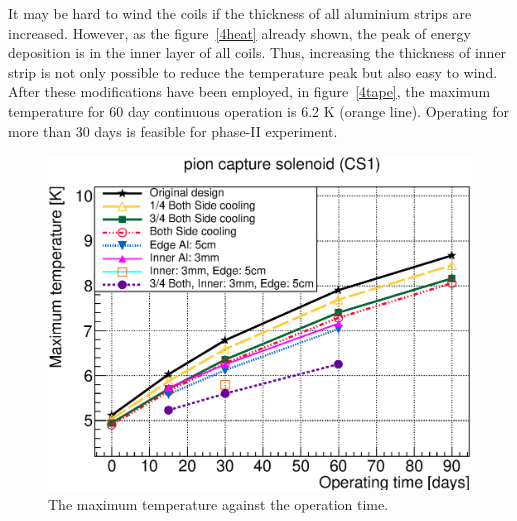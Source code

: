 It may be hard to wind the coils if the thickness of all aluminium strips are increased.
However, as the figure~\ref{4heat} already shown, the peak of energy deposition is in the inner layer of all coils.
Thus, increasing the thickness of inner strip is not only possible to reduce the temperature peak but also easy to wind.
After these modifications have been employed, in figure~\ref{4tape}, the maximum temperature for 60 day continuous operation is 6.2 K (orange line).
Operating for more than 30 days is feasible for phase-II experiment.
  \begin{figure}[H]
   \centering
   \includegraphics[scale=0.55]{chapter5/fig/maxtemp.eps}
   \caption{The maximum temperature against the operation time.}
   \label{4maxtemp}
  \end{figure}

